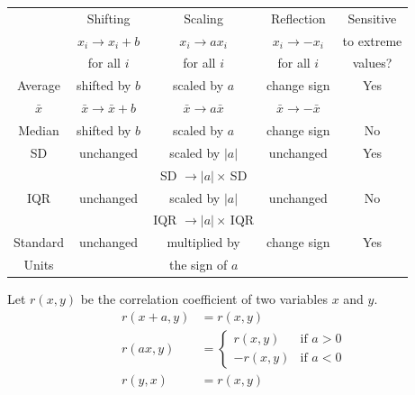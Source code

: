 \documentclass[
  ignorenonframetext,
]{beamer}
\begin{document}
\begin{frame}{}
\protect\hypertarget{section-5}{}
\vspace{-10pt}
\linespread{0.9}
\begin{center}
\begin{tabular}{@{}c|cccc@{}}
       & Shifting & Scaling & Reflection & Sensitive \\[-2pt]
       & $x_i\rightarrow x_i+b$ & $x_i\rightarrow ax_i$ & $x_i\rightarrow -x_i$ & to extreme \\[-2pt]
       & for all $i$ & for all $i$ & for all $i$ & values?\\
\hline
Average   & shifted by $b$ & scaled by $a$ & change sign & Yes\\[-2pt]
$\bar{x}$ & $\bar{x}\rightarrow \bar{x}+b$ & $\bar{x}\rightarrow a\bar{x}$ &$\bar{x}\rightarrow -\bar{x}$ &\\
\hline
Median & shifted by $b$ & scaled by $a$ & change sign & No\\
\hline
SD     & unchanged      & scaled by $|a|$ & unchanged & Yes\\[-2pt]
       &                & SD $\rightarrow |a|\times\,$SD&&\\
\hline
IQR     & unchanged      & scaled by $|a|$ & unchanged & No\\[-2pt]
        &                & IQR $\rightarrow |a|\times\,$IQR&&\\
\hline
Standard& unchanged      & multiplied by & change sign & Yes\\[-2pt]
Units   &                & the sign of $a$ & &\\
\end{tabular}\end{center}
\smallskip

Let \(r(x,y)\) be the correlation coefficient of two variables \(x\) and
\(y\). \begin{align*}
r(x+a, y)&=r(x,y)\\
r(ax,y)&=\displaystyle\begin{cases}
 r(x,y)  & \text{if }a>0\\
 -r(x,y) & \text{if }a<0
\end{cases}\\
r(y,x)&= r(x,y)
\end{align*}
\end{frame}
\end{document}
